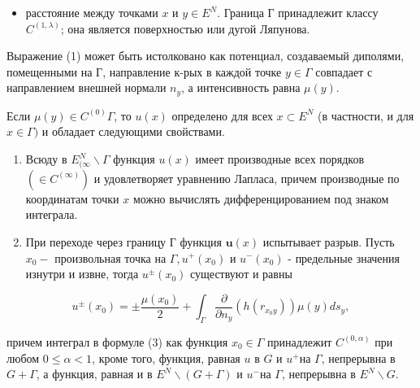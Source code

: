 \documentclass[10pt]{article}
\begin{document}
\begin{itemize}

  \item расстояние между точками $x$ и $y \in E^{N}$. Граница Г принадлежит классу $C^{(1, \lambda)}$; она является поверхностью или дугой Ляпунова.

\end{itemize}



Выражение (1) может быть истолковано как потенциал, создаваемый диполями, помещенными на Г, направление к-рых в каждой точке $y \in \Gamma$ совпадает с направлением внешней нормали $n_{y}$, а интенсивность равна $\mu(y)$.



Если $\mu(y) \in C^{(0)} \Gamma$, то $u(x)$ определено для всех $x \subset E^{N}$ (в частности, и для $x \in \Gamma)$ и обладает следующими свойствами.



\begin{enumerate}

  \item Всюду в $E_{(\infty}^{N} \backslash \Gamma$ функция $u(x)$ имеет производные всех порядков $\left(\in C^{(\infty)}\right)$ и удовлетворяет уравнению Лапласа, причем производные по координатам точки $x$ можно вычислять дифференцированием под знаком интеграла.



  \item При переходе через границу Г функция $\boldsymbol{u}(x)$ испытывает разрыв. Пусть $x_{0}-$ произвольная точка на $\Gamma, u^{+}\left(x_{0}\right)$ и $u^{-}\left(x_{0}\right)$ - предельные значения изнутри и извне, тогда $u^{ \pm}\left(x_{0}\right)$ существуют и равны



\end{enumerate}



\[

u^{ \pm}\left(x_{0}\right)= \pm \frac{\mu\left(x_{0}\right)}{2}+\int_{\Gamma} \frac{\partial}{\partial n_{y}}\left(h\left(r_{x_{0} y}\right)\right) \mu(y) d s_{y},

\]



причем интеграл в формуле (3) как функция $x_{0} \in \Gamma$ принадлежит $C^{(0, \alpha)}$ при любом $0 \leqslant \alpha<1$, кроме того, функция, равная $u$ в $G$ и $u^{+}$на $\Gamma$, непрерывна в $G+\Gamma$, а функция, равная $и$ в $E^{N} \backslash(G+\Gamma)$ и $u^{-}$на $\Gamma$, непрерывна в $E^{N} \backslash G$.
\end{document}
